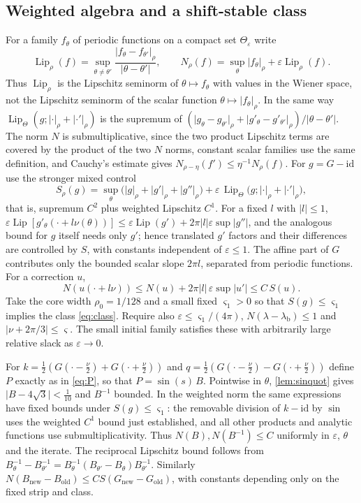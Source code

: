 \documentclass[11pt]{amsart}
\numberwithin{equation}{section}
\theoremstyle{definition}
\theoremstyle{remark}
\newcommand{\eps}{\varepsilon}
\newcommand{\abs}[1]{\lvert #1\rvert}
\newcommand{\Lip}{\operatorname{Lip}}
\newcommand{\id}{\mathrm{id}}
\newcommand{\lb}{\lambda_{\mathrm b}}
\begin{document}
\subsection{Weighted algebra and a shift-stable class}
For a family $f_\theta$ of periodic functions on a compact set $\Theta_\eps$ write
\[
\Lip_\rho(f)=\sup_{\theta\ne\theta'}\frac{\abs{f_\theta-f_{\theta'}}_\rho}{\abs{\theta-\theta'}},\qquad N_\rho(f)=\sup_\theta\abs{f_\theta}_\rho+\eps\Lip_\rho(f).
\]
Thus $\Lip_\rho$ is the Lipschitz seminorm of $\theta\mapsto f_\theta$ with values in the Wiener space, not the Lipschitz seminorm of the scalar function $\theta\mapsto\abs{f_\theta}_\rho$. In the same way $\Lip_\Theta(g;\abs\cdot_\rho+\abs{\cdot'}_\rho)$ is the supremum of $(\abs{g_\theta-g_{\theta'}}_\rho+\abs{g'_\theta-g'_{\theta'}}_\rho)/\abs{\theta-\theta'}$. The norm $N$ is submultiplicative, since the two product Lipschitz terms are covered by the product of the two $N$ norms, constant scalar families use the same definition, and Cauchy's estimate gives $N_{\rho-\eta}(f')\le\eta^{-1}N_\rho(f)$. For $g=G-\id$ use the stronger mixed control
\begin{equation}\label{eq:S}
S_\rho(g)=\sup_\theta\bigl(\abs g_\rho+\abs{g'}_\rho+\abs{g''}_\rho\bigr)+\eps\,\Lip_\Theta\bigl(g;\abs\cdot_\rho+\abs{\cdot'}_\rho\bigr),
\end{equation}
that is, supremum $C^2$ plus weighted Lipschitz $C^1$. For a fixed $l$ with $\abs l\le1$, $\eps\Lip[g'_\theta(\cdot+l\nu(\theta))]\le\eps\Lip(g')+2\pi\abs l\eps\sup\abs{g''}$, and the analogous bound for $g$ itself needs only $g'$; hence translated $g'$ factors and their differences are controlled by $S$, with constants independent of $\eps\le1$. The affine part of $G$ contributes only the bounded scalar slope $2\pi l$, separated from periodic functions. For a correction $u$,
\begin{equation}\label{eq:shiftstable}
N(u(\cdot+l\nu))\le N(u)+2\pi\abs l\,\eps\sup\abs{u'}\le C\,S(u).
\end{equation}
Take the core width $\rho_0=1/128$ and a small fixed $\varsigma_1>0$ so that $S(g)\le\varsigma_1$ implies the class \eqref{eq:class}. Require also $\eps\le\varsigma_1/(4\pi)$, $N(\lambda-\lb)\le1$ and $\abs{\nu+2\pi/3}\le\varsigma$. The small initial family satisfies these with arbitrarily large relative slack as $\eps\to0$.

For $k=\frac12(G(\cdot-\frac\nu2)+G(\cdot+\frac\nu2))$ and $q=\frac12(G(\cdot-\frac\nu2)-G(\cdot+\frac\nu2))$ define $P$ exactly as in \eqref{eq:P}, so that $P=\sin(s)\,B$. Pointwise in $\theta$, \cref{lem:sinquot} gives $\abs{B-4\sqrt3}<\frac1{10}$ and $B^{-1}$ bounded. In the weighted norm the same expressions have fixed bounds under $S(g)\le\varsigma_1$: the removable division of $k-\id$ by $\sin$ uses the weighted $C^1$ bound just established, and all other products and analytic functions use submultiplicativity. Thus $N(B),N(B^{-1})\le C$ uniformly in $\eps$, $\theta$ and the iterate. The reciprocal Lipschitz bound follows from $B_\theta^{-1}-B_{\theta'}^{-1}=B_\theta^{-1}(B_{\theta'}-B_\theta)B_{\theta'}^{-1}$. Similarly $N(B_{\mathrm{new}}-B_{\mathrm{old}})\le CS(G_{\mathrm{new}}-G_{\mathrm{old}})$, with constants depending only on the fixed strip and class.
\end{document}
